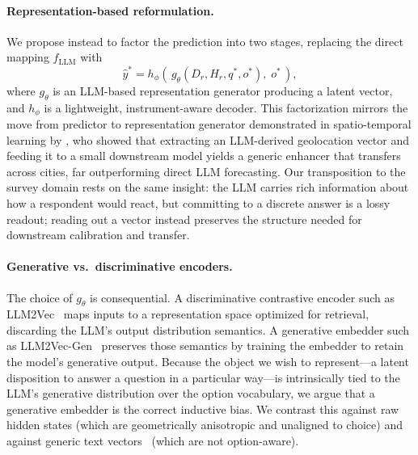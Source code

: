 \paragraph{Representation-based reformulation.} We propose instead to factor the prediction into two stages, replacing the direct mapping $f_{\text{LLM}}$ with
\begin{equation}
\label{eq:factorization}
\hat{y}^\ast = h_\phi\!\left(\, g_\theta(D_r,H_r,q^\ast,o^\ast),\; o^\ast \,\right),
\end{equation}
where $g_\theta$ is an LLM-based representation generator producing a latent vector, and $h_\phi$ is a lightweight, instrument-aware decoder. This factorization mirrors the move from predictor to representation generator demonstrated in spatio-temporal learning by \citet{he2025geolocation}, who showed that extracting an LLM-derived geolocation vector and feeding it to a small downstream model yields a generic enhancer that transfers across cities, far outperforming direct LLM forecasting. Our transposition to the survey domain rests on the same insight: the LLM carries rich information about how a respondent would react, but committing to a discrete answer is a lossy readout; reading out a vector instead preserves the structure needed for downstream calibration and transfer.

\paragraph{Generative vs.\ discriminative encoders.} The choice of $g_\theta$ is consequential. A discriminative contrastive encoder such as LLM2Vec~\citep{behnamghader2024llmvec} maps inputs to a representation space optimized for retrieval, discarding the LLM's output distribution semantics. A generative embedder such as LLM2Vec-Gen~\citep{behnamghader2026llmvecgen} preserves those semantics by training the embedder to retain the model's generative output. Because the object we wish to represent---a latent disposition to answer a question in a particular way---is intrinsically tied to the LLM's generative distribution over the option vocabulary, we argue that a generative embedder is the correct inductive bias. We contrast this against raw hidden states (which are geometrically anisotropic and unaligned to choice) and against generic text vectors~\citep{wang2024multilingual} (which are not option-aware).

